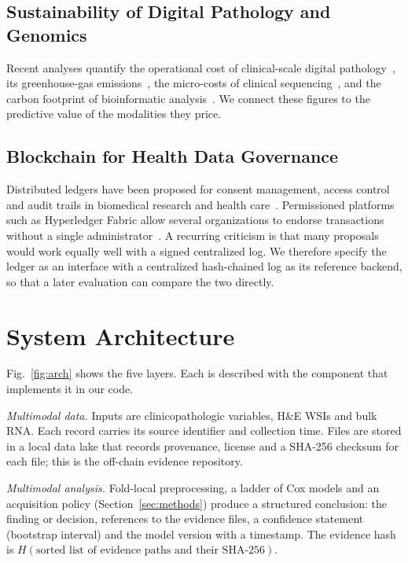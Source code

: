 \documentclass[journal,twoside,web]{IEEEtran}
\newcommand{\bct}[1]{\texorpdfstring{\colorbox{chainbg}{#1}}{#1}}
\newcommand{\bct}[1]{#1}
\begin{document}
\subsection{Sustainability of Digital Pathology and Genomics}
Recent analyses quantify the operational cost of clinical-scale digital pathology~\cite{ardon2023}, its greenhouse-gas emissions~\cite{tilmant2026,vafaeisadr2024}, the micro-costs of clinical sequencing~\cite{altburger2026,cuppen2022,kumar2022}, and the carbon footprint of bioinformatic analysis~\cite{grealey2022}. We connect these figures to the predictive value of the modalities they price.

\subsection{\bct{Blockchain for Health Data Governance}}
\begin{chainbox}
Distributed ledgers have been proposed for consent management, access control and audit trails in biomedical research and health care~\cite{kuo2017,azaria2016}. Permissioned platforms such as Hyperledger Fabric allow several organizations to endorse transactions without a single administrator~\cite{androulaki2018}. A recurring criticism is that many proposals would work equally well with a signed centralized log. We therefore specify the ledger as an interface with a centralized hash-chained log as its reference backend, so that a later evaluation can compare the two directly.
\end{chainbox}

\section{System Architecture}
\label{sec:arch}
Fig.~\ref{fig:arch} shows the five layers. Each is described with the component that implements it in our code.

\textit{Multimodal data.} Inputs are clinicopathologic variables, H\&E WSIs and bulk RNA. Each record carries its source identifier and collection time. Files are stored in a local data lake that records provenance, license and a SHA-256 checksum for each file; this is the off-chain evidence repository.

\textit{Multimodal analysis.} Fold-local preprocessing, a ladder of Cox models and an acquisition policy (Section~\ref{sec:methods}) produce a structured conclusion: the finding or decision, references to the evidence files, a confidence statement (bootstrap interval) and the model version with a timestamp. The evidence hash is $H(\text{sorted list of evidence paths and their SHA-256})$.
\end{document}
